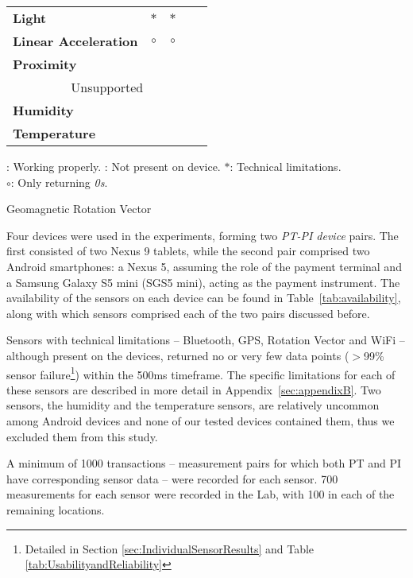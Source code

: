 \documentclass{article}
\newcommand{\cmark}{\ding{51}}\newcommand{\xmark}{\ding{55}}
\begin{document}
\begin{table}[h]
{\begin{threeparttable}
\begin{tabular}{@{}lcccc@{}}
				\textbf{Light} & $\ast$ & $\ast$ & \cmark & \cmark \\
				\textbf{Linear Acceleration} & $\circ$ & $\circ$ & \cmark & \cmark \\
				\textbf{Proximity} & \xmark & \xmark & \cmark & \cmark \\
				\multicolumn{5}{c}{\cellcolor[HTML]{EFEFEF}Unsupported} \\
				\textbf{Humidity} & \xmark & \xmark & \xmark & \xmark \\
				\textbf{Temperature} & \xmark & \xmark & \xmark & \xmark \\ \bottomrule
			\end{tabular}

			\begin{tablenotes}
			\item\cmark: Working properly.
				\xmark: Not present on device.
				$\ast$: Technical limitations.\\
				$\circ$: Only returning \textit{0s}.
			\item[\dag] Geomagnetic Rotation Vector
			\end{tablenotes}
		\end{threeparttable}

	}
\end{table}

Four devices were used in the experiments, forming two \textit{PT-PI device} pairs.
The first consisted of two Nexus 9 tablets, while the second pair comprised two Android smartphones: a Nexus 5, assuming the role of the payment terminal and a Samsung Galaxy S5 mini (SGS5 mini), acting as the payment instrument.  The availability of the sensors on each device can be found in Table~\ref{tab:availability}, along with which sensors comprised each of the two pairs discussed before.




Sensors with technical limitations -- Bluetooth, GPS, Rotation Vector and WiFi -- although present on the devices, returned no or very few data points ($>$99\% sensor failure\footnote{Detailed in Section \ref{sec:IndividualSensorResults} and Table \ref{tab:UsabilityandReliability}}) within the 500ms timeframe.  The specific limitations for each of these sensors are described in more detail in Appendix~\ref{sec:appendixB}.
Two sensors, the humidity and the temperature sensors, are relatively uncommon among Android devices and none of our tested devices contained them, thus we excluded them from this study.

A minimum of 1000 transactions -- measurement pairs for which both PT and PI have corresponding sensor data -- were recorded for each sensor.  700 measurements for each sensor were recorded in the Lab, with 100 in each of the remaining locations.
\end{document}

